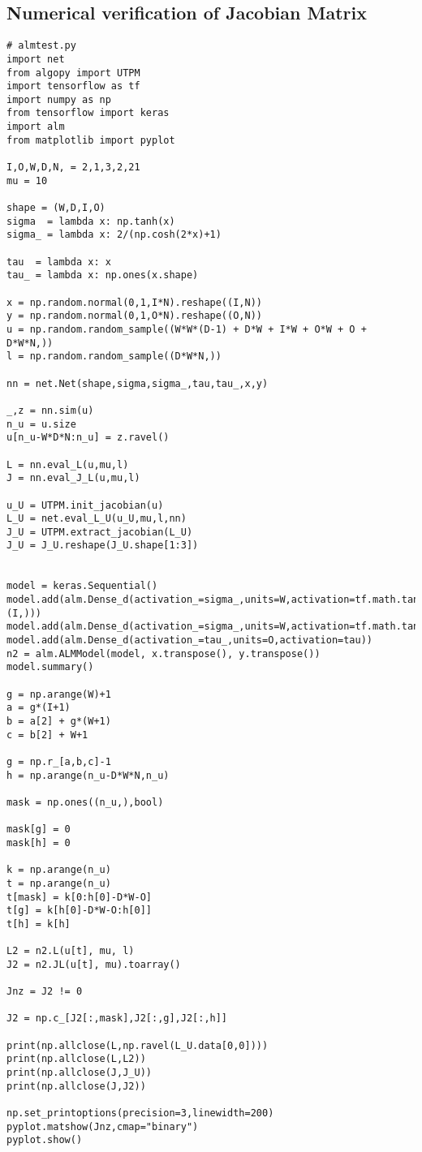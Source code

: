 \subsection{Numerical verification of Jacobian Matrix}
\label{AD}
\begin{verbatim}
# almtest.py
import net
from algopy import UTPM
import tensorflow as tf
import numpy as np
from tensorflow import keras
import alm
from matplotlib import pyplot

I,O,W,D,N, = 2,1,3,2,21
mu = 10

shape = (W,D,I,O)
sigma  = lambda x: np.tanh(x)
sigma_ = lambda x: 2/(np.cosh(2*x)+1)

tau  = lambda x: x
tau_ = lambda x: np.ones(x.shape)

x = np.random.normal(0,1,I*N).reshape((I,N))
y = np.random.normal(0,1,O*N).reshape((O,N))
u = np.random.random_sample((W*W*(D-1) + D*W + I*W + O*W + O + D*W*N,))
l = np.random.random_sample((D*W*N,))

nn = net.Net(shape,sigma,sigma_,tau,tau_,x,y)

_,z = nn.sim(u)
n_u = u.size
u[n_u-W*D*N:n_u] = z.ravel()

L = nn.eval_L(u,mu,l)
J = nn.eval_J_L(u,mu,l)

u_U = UTPM.init_jacobian(u)
L_U = net.eval_L_U(u_U,mu,l,nn)
J_U = UTPM.extract_jacobian(L_U)
J_U = J_U.reshape(J_U.shape[1:3])


model = keras.Sequential()
model.add(alm.Dense_d(activation_=sigma_,units=W,activation=tf.math.tanh,input_shape=(I,)))
model.add(alm.Dense_d(activation_=sigma_,units=W,activation=tf.math.tanh))
model.add(alm.Dense_d(activation_=tau_,units=O,activation=tau))
n2 = alm.ALMModel(model, x.transpose(), y.transpose())
model.summary()

g = np.arange(W)+1
a = g*(I+1)
b = a[2] + g*(W+1)
c = b[2] + W+1

g = np.r_[a,b,c]-1
h = np.arange(n_u-D*W*N,n_u)

mask = np.ones((n_u,),bool)

mask[g] = 0
mask[h] = 0

k = np.arange(n_u)
t = np.arange(n_u)
t[mask] = k[0:h[0]-D*W-O]
t[g] = k[h[0]-D*W-O:h[0]]
t[h] = k[h]

L2 = n2.L(u[t], mu, l)
J2 = n2.JL(u[t], mu).toarray()

Jnz = J2 != 0

J2 = np.c_[J2[:,mask],J2[:,g],J2[:,h]]

print(np.allclose(L,np.ravel(L_U.data[0,0])))
print(np.allclose(L,L2))
print(np.allclose(J,J_U))
print(np.allclose(J,J2))

np.set_printoptions(precision=3,linewidth=200)
pyplot.matshow(Jnz,cmap="binary")
pyplot.show()

\end{verbatim}

